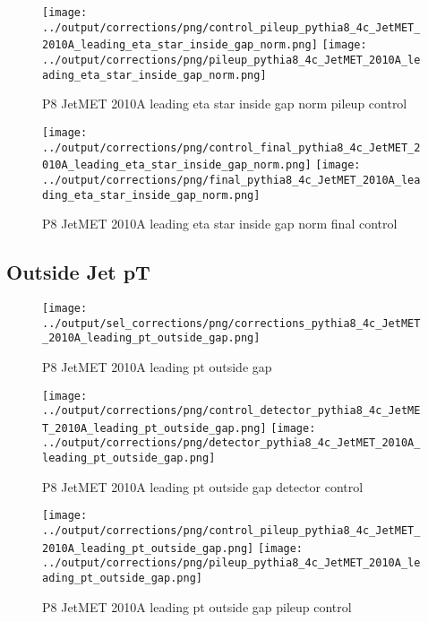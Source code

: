 \documentclass[11pt]{book}
\begin{document}
\begin{figure}[ht]
\centering
\texttt{[image: ../output/corrections/png/control\_pileup\_pythia8\_4c\_JetMET\_2010A\_leading\_eta\_star\_inside\_gap\_norm.png]}
\texttt{[image: ../output/corrections/png/pileup\_pythia8\_4c\_JetMET\_2010A\_leading\_eta\_star\_inside\_gap\_norm.png]}
\caption{P8 JetMET 2010A leading eta star inside gap norm pileup control}
\label{fig:p8_JetMET_2010A_leading_eta_star_inside_gap_norm_pileup_control}
\end{figure}


\begin{figure}[ht]
\centering
\texttt{[image: ../output/corrections/png/control\_final\_pythia8\_4c\_JetMET\_2010A\_leading\_eta\_star\_inside\_gap\_norm.png]}
\texttt{[image: ../output/corrections/png/final\_pythia8\_4c\_JetMET\_2010A\_leading\_eta\_star\_inside\_gap\_norm.png]}
\caption{P8 JetMET 2010A leading eta star inside gap norm final control}
\label{fig:p8_JetMET_2010A_leading_eta_star_inside_gap_norm_final_control}
\end{figure}

\clearpage
\subsection{Outside Jet pT}
\begin{figure}[ht]
\centering
\texttt{[image: ../output/sel\_corrections/png/corrections\_pythia8\_4c\_JetMET\_2010A\_leading\_pt\_outside\_gap.png]}
\caption{P8 JetMET 2010A leading pt outside gap}
\label{fig:p8_JetMET_2010A_leading_pt_outside_gap}
\end{figure}

\begin{figure}[ht]
\centering
\texttt{[image: ../output/corrections/png/control\_detector\_pythia8\_4c\_JetMET\_2010A\_leading\_pt\_outside\_gap.png]}
\texttt{[image: ../output/corrections/png/detector\_pythia8\_4c\_JetMET\_2010A\_leading\_pt\_outside\_gap.png]}
\caption{P8 JetMET 2010A leading pt outside gap detector control}
\label{fig:p8_JetMET_2010A_leading_pt_outside_gap_detector_control}
\end{figure}

\begin{figure}[ht]
\centering
\texttt{[image: ../output/corrections/png/control\_pileup\_pythia8\_4c\_JetMET\_2010A\_leading\_pt\_outside\_gap.png]}
\texttt{[image: ../output/corrections/png/pileup\_pythia8\_4c\_JetMET\_2010A\_leading\_pt\_outside\_gap.png]}
\caption{P8 JetMET 2010A leading pt outside gap pileup control}
\label{fig:p8_JetMET_2010A_leading_pt_outside_gap_pileup_control}
\end{figure}
\end{document}
